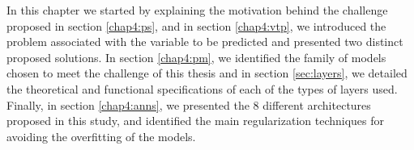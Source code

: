 In this chapter we started by explaining the motivation behind the challenge proposed in section \ref{chap4:ps}, and in section \ref{chap4:vtp}, we introduced the problem associated with the variable to be predicted and presented two distinct proposed solutions. In section \ref{chap4:pm}, we identified the family of models chosen to meet the challenge of this thesis and in section \ref{sec:layers}, we detailed the theoretical and functional specifications of each of the types of layers used. Finally, in section \ref{chap4:anns}, we presented the 8 different architectures proposed in this study, and identified the main regularization techniques for avoiding the overfitting of the models. 
